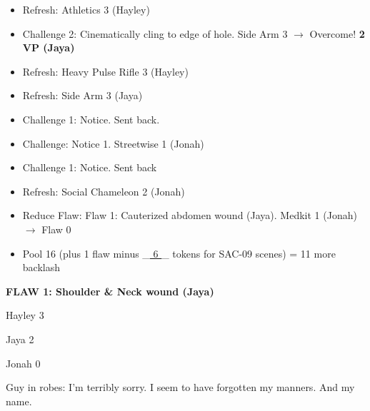 \begin{itemize}[noitemsep,topsep=0pt]
\item Refresh: Athletics 3 (Hayley)
\item Challenge 2: Cinematically cling to edge of hole.  Side Arm 3 $\rightarrow$  Overcome! \textbf{2 VP (Jaya)}
\item Refresh: Heavy Pulse Rifle 3 (Hayley)
\item Refresh: Side Arm 3 (Jaya)
\item Challenge 1: Notice.  Sent back.
\item Challenge: Notice 1.  Streetwise 1 (Jonah)
\item Challenge 1: Notice.  Sent back
\item Refresh: Social Chameleon 2 (Jonah)
\item Reduce Flaw:  {\color[RGB]{255,0,0}Flaw 1: Cauterized abdomen wound (Jaya).}   Medkit 1 (Jonah) $\rightarrow$ Flaw 0
\item Pool 16 (plus 1 flaw minus \_\underline{ 6 }\_ tokens for SAC-09 scenes) = 11 more backlash
\end{itemize}





\textbf{ {\color[RGB]{255,0,0}FLAW 1: Shoulder \& Neck wound (Jaya)} }





{\parskip=0pt
Hayley 3

Jaya 2

Jonah 0
}







Guy in robes: I'm terribly sorry.  I seem to have forgotten my manners.  And my name.


